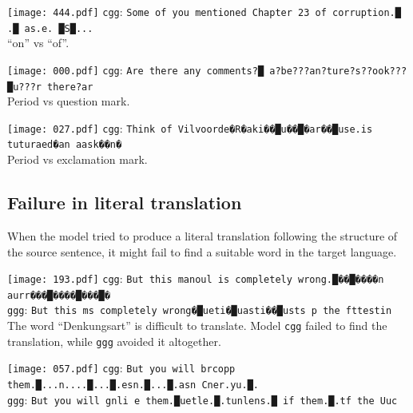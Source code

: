 \documentclass[11pt,twocolumn]{article}
\begin{document}
\vspace{1.2em}\noindent\texttt{[image: 444.pdf]}
\texttt{cgg}: \texttt{Some of you mentioned Chapter 23 of corruption.█ .█ as.e. █S█...}\\

\vspace{-0.8em}
``on'' vs ``of''.

\vspace{1.2em}\noindent\texttt{[image: 000.pdf]}
\texttt{cgg}: \texttt{Are there any comments?█ a?be???an?ture?s??ook???█u???r there?ar}\\

\vspace{-0.8em}
Period vs question mark.

\vspace{1.2em}\noindent\texttt{[image: 027.pdf]}
\texttt{cgg}: \texttt{Think of Vilvoorde�R�aki��█u��█�ar��█use.is tuturaed�an aask��n�}\\

\vspace{-0.8em}
Period vs exclamation mark.

\subsection{Failure in literal translation}\label{sec:fail-liter-transl}

When the model tried to produce a literal translation following the structure of the source sentence,
it might fail to find a suitable word in the target language.

\vspace{1.2em}\noindent\texttt{[image: 193.pdf]}
\texttt{cgg}: \texttt{But this manoul is completely wrong.█��█����n aurr���█����█���█�}\\
\texttt{ggg}: \texttt{But this ms completely wrong�█ueti�█uasti��█usts  p the fttestin}\\

\vspace{-0.8em}
The word ``Denkungsart'' is difficult to translate.
Model \texttt{cgg} failed to find the translation,
while \texttt{ggg} avoided it altogether.

\vspace{1.2em}\noindent\texttt{[image: 057.pdf]}
\texttt{cgg}: \texttt{But you will brcopp them.█...n....█...█.esn.█...█.asn Cner.yu.█.}\\
\texttt{ggg}: \texttt{But you will gnli e them.█uetle.█.tunlens.█ if them.█.tf the Uuc}\\
\end{document}
